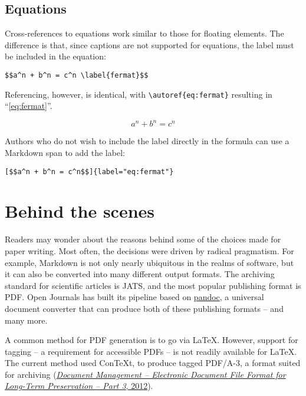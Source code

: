 \documentclass[
]{article}
\begin{document}
\hypertarget{equations}{%
\subsection{Equations}\label{equations}}

Cross-references to equations work similar to those for floating
elements. The difference is that, since captions are not supported for
equations, the label must be included in the equation:

\begin{verbatim}
$$a^n + b^n = c^n \label{fermat}$$
\end{verbatim}

Referencing, however, is identical, with
\texttt{\textbackslash{}autoref\{eq:fermat\}} resulting in
``\autoref{eq:fermat}''.

\[a^n + b^n = c^n \label{eq:fermat}\]

Authors who do not wish to include the label directly in the formula can
use a Markdown span to add the label:

\begin{verbatim}
[$$a^n + b^n = c^n$$]{label="eq:fermat"}
\end{verbatim}

\hypertarget{behind-the-scenes}{%
\section{Behind the scenes}\label{behind-the-scenes}}

Readers may wonder about the reasons behind some of the choices made for
paper writing. Most often, the decisions were driven by radical
pragmatism. For example, Markdown is not only nearly ubiquitous in the
realms of software, but it can also be converted into many different
output formats. The archiving standard for scientific articles is JATS,
and the most popular publishing format is PDF. Open Journals has built
its pipeline based on \href{https://pandoc.org}{pandoc}, a universal
document converter that can produce both of these publishing formats --
and many more.

A common method for PDF generation is to go via LaTeX. However, support
for tagging -- a requirement for accessible PDFs -- is not readily
available for LaTeX. The current method used ConTeXt, to produce tagged
PDF/A-3, a format suited for archiving
(\protect\hyperlink{ref-pdfa3}{\emph{Document Management -- Electronic
Document File Format for Long-Term Preservation -- Part 3}, 2012}).
\end{document}
